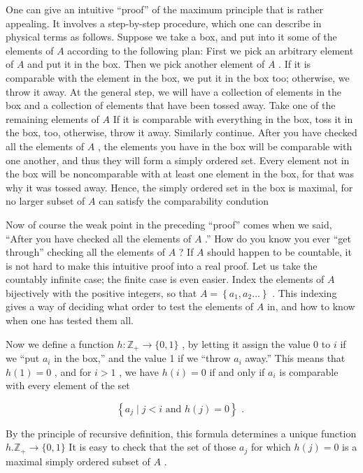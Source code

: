 One can give an intuitive ``proof'' of the maximum principle that is rather appealing. It involves a step-by-step procedure, which one can describe in physical terms as follows. Suppose we take a box, and put into it some of the elements of \(A\) according to the following plan: First we pick an arbitrary element of \(A\) and put it in the box. Then we pick another element of \(A\) . If it is comparable with the element in the box, we put it in the box too; otherwise, we throw it away. At the general step, we will have a collection of elements in the box and a collection of elements that have been tossed away. Take one of the remaining elements of \(A\) If it is comparable with everything in the box, toss it in the box, too, otherwise, throw it away. Similarly continue. After you have checked all the elements of \(A\) , the elements you have in the box will be comparable with one another, and thus they will form a simply ordered set. Every element not in the box will be noncomparable with at least one element in the box, for that was why it was tossed away. Hence, the simply ordered set in the box is maximal, for no larger subset of \(A\) can satisfy the comparability condution

Now of course the weak point in the preceding ``proof'' comes when we said, ``After you have checked all the elements of \(A\) .'' How do you know you ever ``get through'' checking all the elements of \(A\) ? If \(A\) should happen to be countable, it is not hard to make this intuitive proof into a real proof. Let us take the countably infinite case; the finite case is even easier. Index the elements of \(A\) bijectively with the positive integers, so that \(A = \left\{  {{a}_{1},{a}_{2}\ldots }\right\}\) . This indexing gives a way of deciding what order to test the elements of \(A\) in, and how to know when one has tested them all.

Now we define a function \(h : {\mathbb{Z}}_{ + } \rightarrow  \{ 0,1\}\) , by letting it assign the value 0 to \(i\) if we ``put \({a}_{i}\) in the box,'' and the value 1 if we ``throw \({a}_{i}\) away.'' This means that \(h\left( 1\right)  = 0\) , and for \(i > 1\) , we have \(h\left( i\right)  = 0\) if and only if \({a}_{i}\) is comparable with every element of the set

\[
\left\{  {{a}_{j} \mid  j < i\text{ and }h\left( j\right)  = 0}\right\}  \text{ . }
\]

By the principle of recursive definition, this formula determines a unique function \(h.{\mathbb{Z}}_{ + } \rightarrow  \{ 0,1\}\) It is easy to check that the set of those \({a}_{j}\) for which \(h\left( j\right)  = 0\) is a maximal simply ordered subset of \(A\) .

